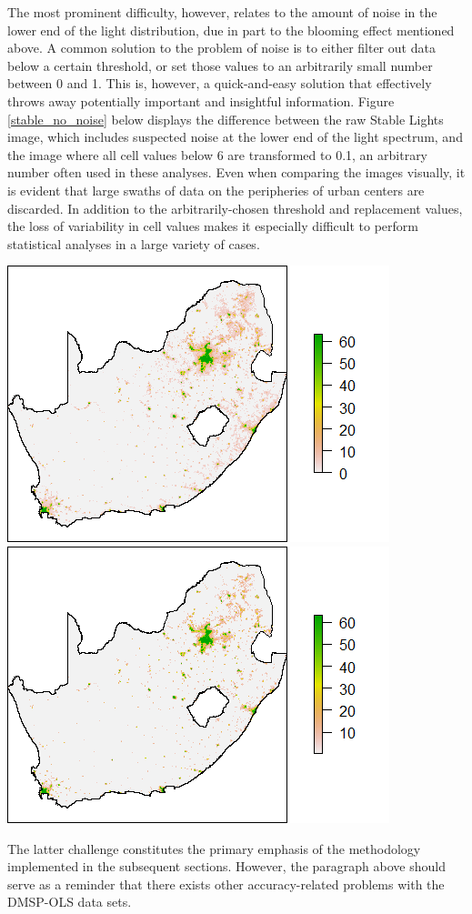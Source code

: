 \documentclass[11pt,preprint, authoryear]{elsarticle}
\let\origfigure\figure
\let\endorigfigure\endfigure
\renewenvironment{figure}[1][2] {
    \expandafter\origfigure\expandafter[H]
} {
    \endorigfigure
}
\numberwithin{equation}{section}
\numberwithin{figure}{section}
\numberwithin{table}{section}
\begin{document}
The most prominent difficulty, however, relates to the amount of noise
in the lower end of the light distribution, due in part to the blooming
effect mentioned above. A common solution to the problem of noise is to
either filter out data below a certain threshold, or set those values to
an arbitrarily small number between 0 and 1. This is, however, a
quick-and-easy solution that effectively throws away potentially
important and insightful information. Figure \ref{stable_no_noise} below
displays the difference between the raw Stable Lights image, which
includes suspected noise at the lower end of the light spectrum, and the
image where all cell values below 6 are transformed to 0.1, an arbitrary
number often used in these analyses. Even when comparing the images
visually, it is evident that large swaths of data on the peripheries of
urban centers are discarded. In addition to the arbitrarily-chosen
threshold and replacement values, the loss of variability in cell values
makes it especially difficult to perform statistical analyses in a large
variety of cases.

\begin{figure}[H]
\includegraphics[width=0.5\linewidth]{figures/stable_SA} \includegraphics[width=0.5\linewidth]{figures/stable_SA_noise_filtered} \caption{\label{stable_no_noise} Left - Raw Stable Lights; Right - Noise Discarded}\label{fig:stable_no_noise}
\end{figure}

The latter challenge constitutes the primary emphasis of the methodology
implemented in the subsequent sections. However, the paragraph above
should serve as a reminder that there exists other accuracy-related
problems with the DMSP-OLS data sets.
\end{document}

